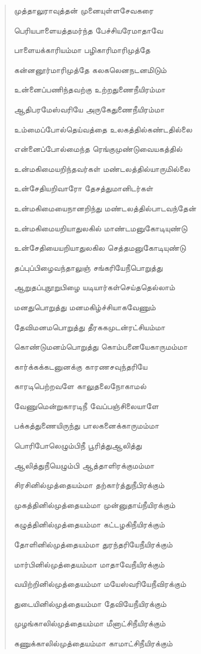 \documentclass{article}
\begin{document}
\begin{quotation}
{முத்தாலுராவுத்தன் முனையுள்ளசேவகரை

பெரியபாளையத்தமர்ந்த பேச்சியரேமாதாவே

பாளையக்காரியம்மா பழிகாரிமாரிமுத்தே

கன்னனூர்மாரிமுத்தே கலகலெனநடனமிடும்

உன்னைப்பணிந்தவற்கு உற்றதுணைநீயிரம்மா

ஆதிபரமேஸ்வரியே அருகேதுணைநீயிரம்மா

உம்மைப்போல்தெய்வத்தை உலகத்தில்கண்டதில்லை

என்னைப்போல்மைந்த ரெங்குமுண்டுவையகத்தில்

உன்மகிமையறிந்தவர்கள் மண்டலத்தில்யாருமில்லை

உன்சேதியறிவாரோ தேசத்துமானிடர்கள்

உன்மகிமையைநானறிந்து மண்டலத்தில்பாடவந்தேன்

உன்மகிமையறியாதுலகில் மாண்டமனுகோடியுண்டு

உன்சேதியையறியாதுலகில செத்தமனுகோடியுண்டு

தப்புப்பிழைவந்தாலுஞ் சங்கரியேநீபொறுத்து

ஆறுதப்புநூறுபிழை யடியார்கள்செய்ததெல்லாம்

மனதுபொறுத்து மனமகிழ்ச்சியாகவேணும்

தேவிமனமபொறுத்து தீரககமுடன்ரட்சியம்மா

கொண்டுமனம்பொறுத்து கொம்பனையேகாருமம்மா

கார்க்கக்கடனுனக்கு காரணசவுந்தரியே

காரடிபெற்றவளே காலுதலைநோகாமல்

வேணுமென்றுகாரடிநீ வேப்பஞ்சிலையாளே

பக்கத்துணையிருந்து பாலகனைக்காருமம்மா

பொரிபோலெழும்பிநீ பூரித்துஆலித்து

ஆலித்துநீயெழும்பி ஆத்தாளிரக்குமம்மா

சிரசினில்முத்தையம்மா தற்கார்த்துநீபிரக்கும்

முகத்‌தினில்முத்தையம்மா முன்னுதாய்நீயிரக்கும்

கழுத்தினில்முத்தையம்மா கட்டழகிநீயிரக்கும்

தோளினில்முத்தையம்மா துரந்தரியேநீயிரக்கும்

மார்பினில்முத்தையம்மா மாதாவேநீயிரக்கும்

வயிற்றினில்முத்தையம்மா மயேஸ்வரியேநீவிரக்கும்

துடையினில்முத்தையம்மா தேவியேநீயிரக்கும்

முழங்காலில்முத்தையம்மா மீனாட்சிநீயிரக்கும்

கணுக்காலில்முத்தையம்மா காமாட்சிநீயிரக்கும்

}
\end{quotation}
\end{document}
